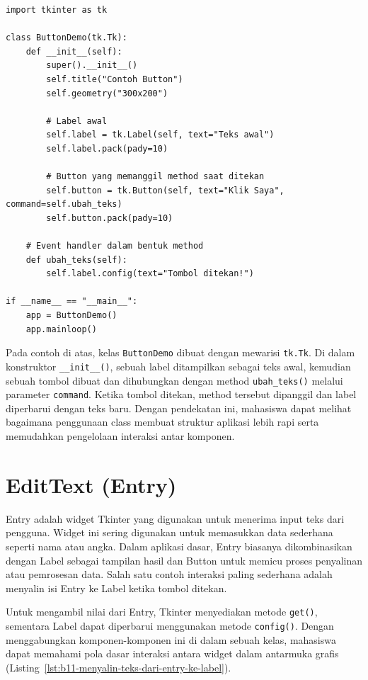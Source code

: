 \begin{lstlisting}[style=PythonStyle, caption={Contoh Button dan Interaksi dengan Label Menggunakan Class}, label={lst:b11-button-interaksi-dengan-label-menggunakan-class}]
import tkinter as tk

class ButtonDemo(tk.Tk):
    def __init__(self):
        super().__init__()
        self.title("Contoh Button")
        self.geometry("300x200")

        # Label awal
        self.label = tk.Label(self, text="Teks awal")
        self.label.pack(pady=10)

        # Button yang memanggil method saat ditekan
        self.button = tk.Button(self, text="Klik Saya", command=self.ubah_teks)
        self.button.pack(pady=10)

    # Event handler dalam bentuk method
    def ubah_teks(self):
        self.label.config(text="Tombol ditekan!")

if __name__ == "__main__":
    app = ButtonDemo()
    app.mainloop()
\end{lstlisting}

Pada contoh di atas, kelas \texttt{ButtonDemo} dibuat dengan mewarisi \texttt{tk.Tk}. Di dalam konstruktor \texttt{\_\_init\_\_()}, sebuah label ditampilkan sebagai teks awal, kemudian sebuah tombol dibuat dan dihubungkan dengan method \texttt{ubah\_teks()} melalui parameter \texttt{command}. Ketika tombol ditekan, method tersebut dipanggil dan label diperbarui dengan teks baru. Dengan pendekatan ini, mahasiswa dapat melihat bagaimana penggunaan class membuat struktur aplikasi lebih rapi serta memudahkan pengelolaan interaksi antar komponen.


\section{EditText (Entry)}

Entry adalah widget Tkinter yang digunakan untuk menerima input teks dari pengguna. Widget ini sering digunakan untuk memasukkan data sederhana seperti nama atau angka. Dalam aplikasi dasar, Entry biasanya dikombinasikan dengan Label sebagai tampilan hasil dan Button untuk memicu proses penyalinan atau pemrosesan data. Salah satu contoh interaksi paling sederhana adalah menyalin isi Entry ke Label ketika tombol ditekan.

Untuk mengambil nilai dari Entry, Tkinter menyediakan metode \texttt{get()}, sementara Label dapat diperbarui menggunakan metode \texttt{config()}. Dengan menggabungkan komponen-komponen ini di dalam sebuah kelas, mahasiswa dapat memahami pola dasar interaksi antara widget dalam antarmuka grafis (Listing~\ref{lst:b11-menyalin-teks-dari-entry-ke-label}).

